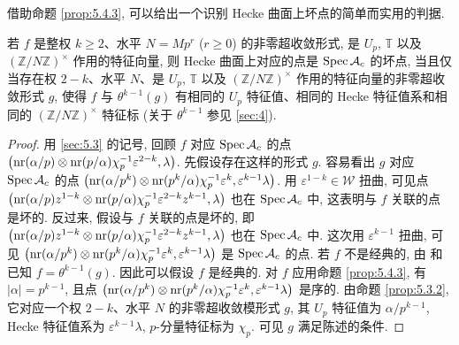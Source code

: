 借助命题 \ref{prop:5.4.3}, 可以给出一个识别 Hecke 曲面上坏点的简单而实用的判据.

\begin{proposition}\label{prop:5.4.4}
若 $f$ 是整权 $k \ge 2$、水平 $N = Mp^{r}$ ($r \ge 0$) 的非零超收敛形式, 是 $U_p$, $\mathbb{T}$ 以及 $(\mathbb{Z}/N\mathbb{Z})^{\times}$ 作用的特征向量, 则 Hecke 曲面上对应的点是 $\operatorname{Spec} \mathcal{A}_c$ 的坏点, 当且仅当存在权 $2-k$、水平 $N$、是 $U_p$, $\mathbb{T}$ 以及 $(\mathbb{Z}/N\mathbb{Z})^{\times}$ 作用的特征向量的非零超收敛形式 $g$, 使得 $f$ 与 $\theta^{k-1}(g)$ 有相同的 $U_p$ 特征值、相同的 Hecke 特征值系和相同的 $(\mathbb{Z}/N\mathbb{Z})^{\times}$ 特征标 (关于 $\theta^{k-1}$ 参见 \ref{sec:4}).
\end{proposition}

\begin{proof}
用 \ref{sec:5.3} 的记号, 回顾 $f$ 对应 $\operatorname{Spec} \mathcal{A}_c$ 的点 $\bigl(\operatorname{nr}(\alpha/p) \otimes \operatorname{nr}(p/\alpha)\chi_p^{-1}\varepsilon^{2-k},\lambda\bigr)$.
先假设存在这样的形式 $g$.
容易看出 $g$ 对应 $\operatorname{Spec} \mathcal{A}_c$ 的点 $\bigl(\operatorname{nr}(\alpha/p^{k}) \otimes \operatorname{nr}(p^{k}/\alpha)\chi_p^{-1}\varepsilon^{k},\varepsilon^{k-1}\lambda\bigr)$.
用 $\varepsilon^{1-k} \in \mathcal{W}$ 扭曲, 可见点 $\bigl(\operatorname{nr}(\alpha/p)z^{1-k} \otimes \operatorname{nr}(p/\alpha)\chi_p^{-1}\varepsilon^{2-k}z^{k-1},\lambda\bigr)$ 也在 $\operatorname{Spec} \mathcal{A}_c$ 中, 这表明与 $f$ 关联的点是坏的.
反过来, 假设与 $f$ 关联的点是坏的, 即 $\bigl(\operatorname{nr}(\alpha/p)z^{1-k} \otimes \operatorname{nr}(p/\alpha)\chi_p^{-1}\varepsilon^{2-k}z^{k-1},\lambda\bigr)$ 也在 $\operatorname{Spec} \mathcal{A}_c$ 中.
这次用 $\varepsilon^{k-1}$ 扭曲, 可见 $\bigl(\operatorname{nr}(\alpha/p^{k}) \otimes \operatorname{nr}(p^{k}/\alpha)\chi_p^{-1}\varepsilon^{k},\varepsilon^{k-1}\lambda\bigr)$ 是 $\operatorname{Spec} \mathcal{A}_c$ 的点.
若 $f$ 不是经典的, 由 \cite{ref:13} 和 \cite{ref:14} 已知 $f = \theta^{k-1}(g)$.
因此可以假设 $f$ 是经典的.
对 $f$ 应用命题 \ref{prop:5.4.3}, 有 $|\alpha| = p^{k-1}$, 且点 $\bigl(\operatorname{nr}(\alpha/p^{k}) \otimes \operatorname{nr}(p^{k}/\alpha)\chi_p^{-1}\varepsilon^{k},\varepsilon^{k-1}\lambda\bigr)$ 是序的.
由命题 \ref{prop:5.3.2}, 它对应一个权 $2-k$、水平 $N$ 的非零超收敛模形式 $g$, 其 $U_p$ 特征值为 $\alpha/p^{k-1}$, Hecke 特征值系为 $\varepsilon^{k-1}\lambda$, $p$-分量特征标为 $\chi_p$.
可见 $g$ 满足陈述的条件.
\end{proof}

